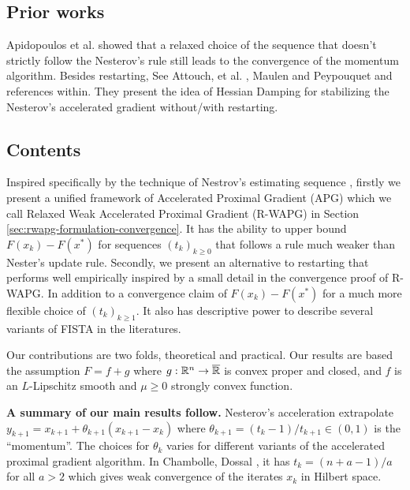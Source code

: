 \documentclass[12pt]{article}
\begin{document}
        \subsection{Prior works}
            Apidopoulos et al. \cite{apidopoulos_convergence_2018} showed that a relaxed choice of the sequence that doesn't strictly follow the Nesterov's rule still leads to the convergence of the momentum algorithm. 
            Besides restarting, See Attouch, et al. \cite{attouch_first-order_2022}, Maulen and Peypouquet \cite{maulen_speed_2023} and references within.
            They present the idea of Hessian Damping for stabilizing the Nesterov's accelerated gradient without/with restarting. 

    \subsection{Contents}
        Inspired specifically by the technique of Nestrov's estimating sequence \cite{nesterov_lectures_2018}, firstly we present a unified framework of Accelerated Proximal Gradient (APG) which we call Relaxed Weak Accelerated Proximal Gradient (R-WAPG) in Section \ref{sec:rwapg-formulation-convergence}.
        It has the ability to upper bound $F(x_k) - F(x^*)$ for sequences $(t_k)_{k \ge 0}$ that follows a rule much weaker than Nester's update rule. 
        Secondly, we present an alternative to restarting that performs well empirically inspired by a small detail in the convergence proof of R-WAPG. 
        In addition to a convergence claim of $F(x_k)- F(x^*)$ for a much more flexible choice of $(t_k)_{k \ge 1}$. 
        It also has descriptive power to describe several variants of FISTA in the literatures.  
        \par
        Our contributions are two folds, theoretical and practical. 
        Our results are based the assumption $F = f + g$ where $g:\mathbb R^n \rightarrow \overline{\mathbb R}$ is convex proper and closed, and $f$ is an $L$-Lipschitz smooth and $\mu \ge 0$ strongly convex function. 
        \par
        \textbf{A summary of our main results follow. } 
        Nesterov's acceleration extrapolate $y_{k + 1} = x_{k + 1} + \theta_{k + 1}(x_{k + 1} - x_k)$ where $\theta_{k + 1} = (t_{k} - 1)/t_{k + 1} \in (0, 1)$ is the ``momentum''. 
        The choices for $\theta_k$ varies for different variants of the accelerated proximal gradient algorithm. 
        In Chambolle, Dossal \cite{chambolle_convergence_2015}, it has $t_k = (n + a - 1)/a$ for all $a > 2$ which gives weak convergence of the iterates $x_k$ in Hilbert space. 
\end{document}
